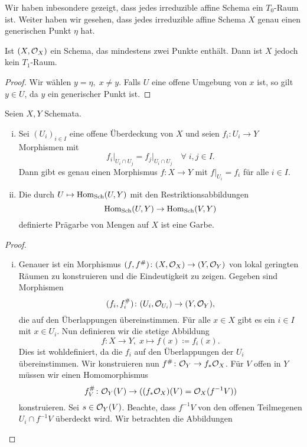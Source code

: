 \begin{bem*}
	Wir haben inbesondere gezeigt, dass jedes irreduzible affine Schema ein $T_0$-Raum ist. Weiter haben wir gesehen, dass jedes irreduzible affine Schema $X$ genau einen generischen Punkt $\eta$ hat.

	Ist $(X,\mathcal{O}_X)$ ein Schema, das mindestens zwei Punkte enthält. Dann ist $X$ jedoch kein $T_1$-Raum.
	\begin{proof}
		Wir wählen $y = \eta,\; x \neq y$. Falls $U$ eine offene Umgebung von $x$ ist, so gilt $y \in U$, da $y$ ein generischer Punkt ist.		
	\end{proof}
\end{bem*}

\begin{lem}
\label{lem:5.5}
	Seien $X,Y$ Schemata.
	\begin{enumerate}[i)]
		\item Sei $(U_i)_{i\in I}$ eine offene Überdeckung von $X$ und seien $f_i\colon U_i\to Y$ Morphismen mit
		\[
			f_i\vert_{U_i\cap U_j} = f_j\vert_{U_i\cap U_j} \quad \forall\; i,j \in I.
		\]
		Dann gibt es genau einen Morphismus $f \colon X \to Y$ mit $f\vert_{U_i} = f_i$ für alle $i \in I$.
		\item Die durch $U \mapsto \operatorname{Hom}_{\operatorname{Sch}}(U,Y)$ mit den Restriktionsabbildungen
		\[
			\operatorname{Hom}_{\operatorname{Sch}}(U,Y) \to \operatorname{Hom}_{\operatorname{Sch}}(V,Y)
		\]
		definierte Prägarbe von Mengen auf $X$ ist eine Garbe.
	\end{enumerate}
	\begin{proof}
		\begin{enumerate}[i)]
			\item Genauer ist ein Morphismus $(f,f^{\#})\colon (X,\mathcal{O}_X) \to (Y,\mathcal{O}_Y)$ von lokal geringten Räumen zu konstruieren und die Eindeutigkeit zu zeigen. Gegeben sind Morphismen
			\[
				(f_i,f_i^{\#})\colon (U_i,\mathcal{O}_{U_i}) \to (Y,\mathcal{O}_Y),
			\]
			die auf den Überlappungen übereinstimmen. Für alle $x \in X$ gibt es ein $i \in I$ mit $x \in U_i$. Nun definieren wir die stetige Abbildung
			\[
				f\colon X \to Y,\; x \mapsto f(x) \coloneqq f_i(x).
			\]
			Dies ist wohldefiniert, da die $f_i$ auf den Überlappungen der $U_i$ übereinstimmen. Wir konstruieren nun $f^{\#}\colon \mathcal{O}_Y \to f_*\mathcal{O}_X$. Für $V$ offen in $Y$ müssen wir einen Homomorphismus
			\[
				f^{\#}_V\colon \mathcal{O}_Y(V) \to ((f_*\mathcal{O}_X)(V) = \mathcal{O}_X(f^{-1}V))
			\]
			konstruieren. Sei $s \in \mathcal{O}_Y(V)$. Beachte, dass $f^{-1}V$ von den offenen Teilmegenen $U_i \cap f^{-1}V$ überdeckt wird. Wir betrachten die Abbildungen

\end{enumerate}
\end{proof}
\end{lem}
